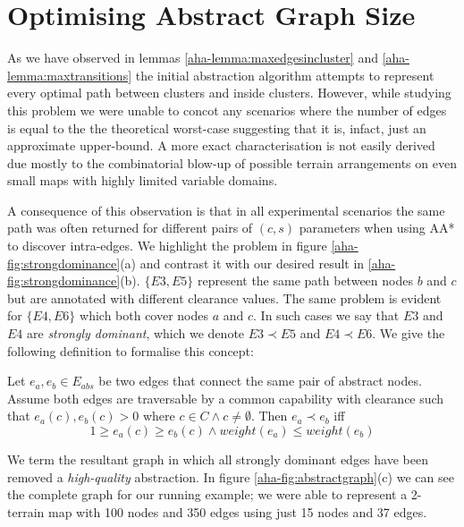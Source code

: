 \section{Optimising Abstract Graph Size}
\par \indent
As we have observed in lemmas \ref{aha-lemma:maxedgesincluster} and \ref{aha-lemma:maxtransitions} the initial abstraction algorithm attempts to represent every optimal path between clusters and inside clusters. 
However, while studying this problem we were unable to concot any scenarios where the number of edges is equal to the the theoretical worst-case suggesting that it is, infact, just an approximate upper-bound.  
A more exact characterisation is not easily derived due mostly to the combinatorial blow-up of possible terrain arrangements on even small maps with highly limited variable domains.
\par \indent 
A consequence of this observation is that in all experimental scenarios the same path was often returned for different pairs of $(c, s)$ parameters when using AA* to discover intra-edges. We highlight the problem in figure \ref{aha-fig:strongdominance}(a) and contrast it with our desired result in \ref{aha-fig:strongdominance}(b). $\lbrace E3, E5 \rbrace$ represent the same path between nodes $b$ and $c$ but are annotated with different clearance values. The same problem is evident for $\lbrace E4, E6 \rbrace$ which both cover nodes $a$ and $c$. In such cases we say that $E3$ and $E4$ are \emph{strongly dominant}, which we denote $E3 \prec E5$ and $E4 \prec E6$. We give the following definition to formalise this concept:

\begin{theorem}
\label{aha-definition:strongdominance}
Let $e_{a}, e_{b} \in E_{abs}$ be two edges that connect the same pair of abstract nodes. 
Assume both edges are traversable by a common capability with clearance such that $e_{a}(c), e_{b}(c) > 0$ where $c \in C \wedge c \neq \emptyset$. Then $e_{a} \prec e_{b}$ iff
$$ 1 \geq e_{a}(c) \geq e_{b}(c) \wedge weight(e_{a}) \leq weight(e_{b})$$
\end{theorem}

We term the resultant graph in which all strongly dominant edges have been removed a \emph{high-quality} abstraction.  
In figure \ref{aha-fig:abstractgraph}(c) we can see the complete graph for our running example; we were able to represent a 2-terrain map with 100 nodes and 350 edges using just 15 nodes and  37 edges. 

